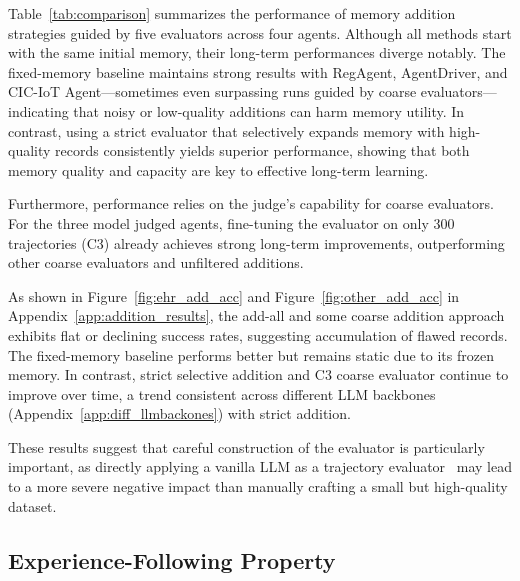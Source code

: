 \documentclass[11pt]{article}
\theoremstyle{plain}
\theoremstyle{definition}
\begin{document}
{
Table~\ref{tab:comparison} summarizes the performance of memory addition strategies guided by five evaluators across four agents.
Although all methods start with the same initial memory, their long-term performances diverge notably. The fixed-memory baseline maintains strong results with RegAgent, AgentDriver, and CIC-IoT Agent—sometimes even surpassing runs guided by coarse evaluators—indicating that noisy or low-quality additions can harm memory utility. In contrast, using a strict evaluator that selectively expands memory with high-quality records consistently yields superior performance, showing that both memory quality and capacity are key to effective long-term learning.

Furthermore, performance relies on the judge's capability for coarse evaluators. For the three model judged agents, fine-tuning the evaluator on only 300 trajectories (C3) already achieves strong long-term improvements, outperforming other coarse evaluators and unfiltered additions. 

As shown in Figure~\ref{fig:ehr_add_acc} and Figure~\ref{fig:other_add_acc} in Appendix~\ref{app:addition_results}, the add-all and some coarse addition approach exhibits flat or declining success rates, suggesting accumulation of flawed records. The fixed-memory baseline performs better but remains static due to its frozen memory. In contrast, strict selective addition and C3 coarse evaluator continue to improve over time, a trend consistent across different LLM backbones (Appendix~\ref{app:diff_llmbackones}) with strict addition.

These results suggest that careful construction of the evaluator is particularly important, as directly applying a vanilla LLM as a trajectory evaluator~\citep{wang2024agent,pan2024autonomous} may lead to a more severe negative impact than manually crafting a small but high-quality dataset.
}

\subsection{Experience-Following Property}
\label{sec:add_experience_follow}
\end{document}
